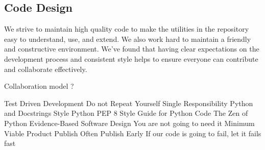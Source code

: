 \subsection{Code Design}

We strive to maintain high quality code to make the utilities in the repository easy to 
understand, use, and extend. We also work hard to maintain a friendly and constructive 
environment. We've found that having clear expectations on the development process 
and consistent style helps to ensure everyone can contribute and collaborate effectively.


Collaboration model ?

Test Driven Development
Do not Repeat Yourself
Single Responsibility
Python and Docstrings Style
Python PEP 8 Style Guide for Python Code
The Zen of Python
Evidence-Based Software Design
You are not going to need it
Minimum Viable Product
Publish Often Publish Early
If our code is going to fail, let it fails fast

